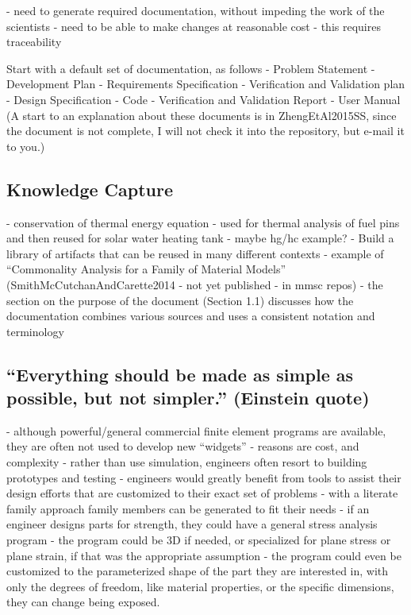 \documentclass[10pt, preprint]{sigplanconf}
\begin{document}
- need to generate required documentation, without impeding the work of the scientists
- need to be able to make changes at reasonable cost - this requires traceability

Start with a default set of documentation, as follows
	- Problem Statement
	- Development Plan
	- Requirements Specification
	- Verification and Validation plan
	- Design Specification
	- Code
	- Verification and Validation Report
	- User Manual
(A start to an explanation about these documents is in ZhengEtAl2015SS, since the document is not complete, I will not check it into the repository, but e-mail it to you.)

\subsection{Knowledge Capture}
\label{subsec:knowledge}

- conservation of thermal energy equation - used for thermal analysis of fuel pins and then reused for solar water heating tank
- maybe hg/hc example?
- Build a library of artifacts that can be reused in many different contexts
- example of “Commonality Analysis for a Family of Material Models” (SmithMcCutchanAndCarette2014 - not yet published - in mmsc repos) - the section on the purpose of the document (Section 1.1) discusses how the documentation combines various sources and uses a consistent notation and terminology

\subsection{``Everything should be made as simple as possible, but not simpler.'' (Einstein quote)}
\label{subsec:everything}

- although powerful/general commercial finite element programs are available, they are often not used to develop new “widgets”
- reasons are cost, and complexity
- rather than use simulation, engineers often resort to building prototypes and testing
- engineers would greatly benefit from tools to assist their design efforts that are customized to their exact set of problems - with a literate family approach family members can be generated to fit their needs
- if an engineer designs parts for strength, they could have a general stress analysis program - the program could be 3D if needed, or specialized for plane stress or plane strain, if that was the appropriate assumption - the program could even be customized to the parameterized shape of the part they are interested in, with only the degrees of freedom, like material properties, or the specific dimensions, they can change being exposed.
\end{document}
